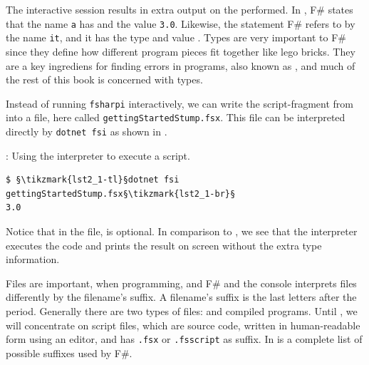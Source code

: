 \documentclass[springer.tex]{subfiles}
\begin{document}
The interactive session results in extra output on the  performed. In , F\# states that the name \lstinline{a} has   and the value \lstinline{3.0}. Likewise, the  statement F\# refers to by the name \lstinline{it}, and it has the type  and value \lexeme{()}. Types are very important to F\# since they define how different program pieces fit together like lego bricks. They are a key ingrediens for finding errors in programs, also known as , and much of the rest of this book is concerned with types.

Instead of running \lstinline[language=console]{fsharpi} interactively, we can write the script-fragment from  into a file, here called \lstinline[language=console]{gettingStartedStump.fsx}. This file can be interpreted directly by \lstinline[language=console]{dotnet fsi} as shown in .
%
\begin{codeNOutput}[label=commandlineInterpreter,
  top=-5pt,
  bottom=-5pt,
  left=-2pt,
  right=-2pt,
]{: Using the interpreter to execute a script.}
\begin{lstlisting}[language=console,escapechar=§]
$ §\tikzmark{lst2_1-tl}§dotnet fsi gettingStartedStump.fsx§\tikzmark{lst2_1-br}§
3.0
\end{lstlisting}%
\end{codeNOutput}
%
%
Notice that in the file, \lexeme{;;} is optional. In comparison to , we see that the interpreter executes the code and prints the result on screen without the extra type information.

Files are important, when programming, and F\# and the console interprets files differently by the filename's suffix. A filename's suffix is the last letters after the period. Generally there are two types of files:  and compiled programs. Until , we will concentrate on script files, which are source code, written in human-readable form using an editor, and has \texttt{.fsx} or \texttt{.fsscript} as suffix. In  is a complete list of possible suffixes used by F\#.
\end{document}
